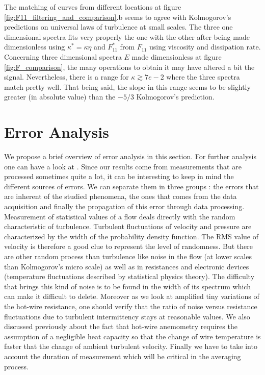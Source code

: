 \documentclass[12pt]{article}
\begin{document}
The matching of curves from different locations at figure \ref{fig:F11_filtering_and_comparison}.b seems to agree with Kolmogorov's predictions on universal laws of turbulence at small scales. The three one dimensional spectra fits very properly the one with the other after being made dimensionless using $\kappa^* = \kappa \eta$ and $F_{11}^*$ from $F_{11}$ using viscosity and dissipation rate. Concerning three dimensional spectra $E$ made dimensionless at figure \ref{fig:F_comparison}, the many operations to obtain it may have altered a bit the signal. Nevertheless, there is a range for $\kappa \gtrsim 7e-2$ where the three spectra match pretty well. That being said, the slope in this range seems to be slightly greater (in absolute value) than the $-5/3$ Kolmogorov's prediction.

\section{Error Analysis}

We propose a brief overview of error analysis in this section. For further analysis one can have a look at \cite{derksenCalibrationErrorMeasurement1995}. Since our results come from measurements that are processed sometimes quite a lot, it can be interesting to keep in mind the different sources of errors. We can separate them in three groups : the errors that are inherent of the studied phenomena, the ones that comes from the data acquisition and finally the propagation of this error through data processing.\\

Measurement of statistical values of a flow deals directly with the random characteristic of turbulence. Turbulent fluctuations of velocity and pressure are characterized by the width of the probability density function. The RMS value of velocity is therefore a good clue to represent the level of randomness. But there are other random process than turbulence like noise in the flow (at lower scales than Kolmogorov's micro scale) as well as in resistances and electronic devices (temperature fluctuations described by statistical physics theory). The difficulty that brings this kind of noise is to be found in the width of its spectrum which can make it difficult to delete. Moreover as we look at amplified tiny variations of the hot-wire resistance, one should verify that the ratio of noise versus resistance fluctuations due to turbulent intermittency stays at reasonable values. We also discussed previously about the fact that hot-wire anemometry requires the assumption of a negligible heat capacity so that the change of wire temperature is faster that the change of ambient turbulent velocity. Finally we have to take into account the duration of measurement which will be critical in the averaging process.\\
\end{document}
